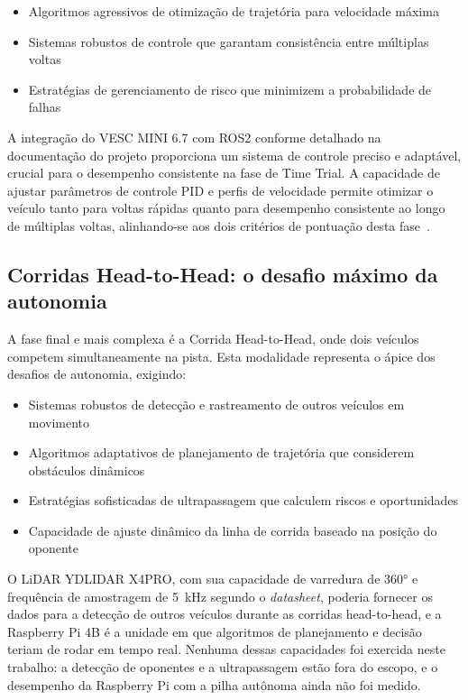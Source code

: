 \begin{itemize}
      \item Algoritmos agressivos de otimização de trajetória para velocidade máxima
      \item Sistemas robustos de controle que garantam consistência entre múltiplas voltas
      \item Estratégias de gerenciamento de risco que minimizem a probabilidade de falhas
\end{itemize}

A integração do VESC MINI 6.7 com ROS2 conforme detalhado na documentação do
projeto proporciona um sistema de controle preciso e adaptável, crucial para o
desempenho consistente na fase de Time Trial. A capacidade de ajustar
parâmetros de controle PID e perfis de velocidade permite otimizar o veículo
tanto para voltas rápidas quanto para desempenho consistente ao longo de
múltiplas voltas, alinhando-se aos dois critérios de pontuação desta
fase~\cite{F1TENTHRules2023}.

\subsection{Corridas Head-to-Head: o desafio máximo da autonomia}

A fase final e mais complexa é a Corrida Head-to-Head, onde dois veículos
competem simultaneamente na pista. Esta modalidade representa o ápice dos
desafios de autonomia, exigindo:

\begin{itemize}
      \item Sistemas robustos de detecção e rastreamento de outros veículos em movimento
      \item Algoritmos adaptativos de planejamento de trajetória que considerem obstáculos
            dinâmicos
      \item Estratégias sofisticadas de ultrapassagem que calculem riscos e oportunidades
      \item Capacidade de ajuste dinâmico da linha de corrida baseado na posição do
            oponente
\end{itemize}

O LiDAR YDLIDAR X4PRO, com sua capacidade de varredura de 360° e frequência de
amostragem de 5~kHz segundo o \textit{datasheet}, poderia fornecer os dados
para a detecção de outros veículos durante as corridas head-to-head, e a
Raspberry Pi 4B é a unidade em que algoritmos de planejamento e decisão teriam
de rodar em tempo real. Nenhuma dessas capacidades foi exercida neste trabalho:
a detecção de oponentes e a ultrapassagem estão fora do escopo, e o desempenho
da Raspberry Pi com a pilha autônoma ainda não foi medido.

